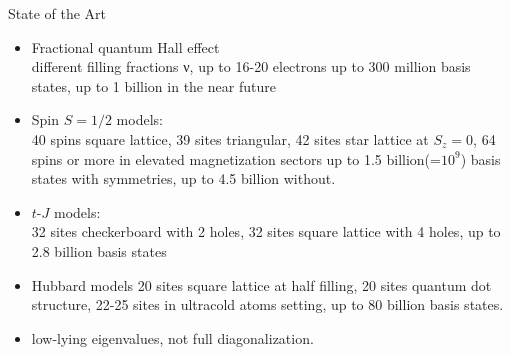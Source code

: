 \documentclass{beamer}
\begin{document}
\begin{frame}{State of the Art}

\begin{itemize}
   \item  Fractional quantum Hall effect\\
    different filling fractions ν, up to 16-20 electrons up to 300 million basis states, up to 1 billion in the near future
    \item Spin $S=1/2$ models:\\
  40 spins square lattice, 39 sites triangular, 42 sites star lattice at $S_z=0$, 64 spins or more in elevated magnetization sectors up to 1.5 billion(=$10^9$) basis states with symmetries, up to 4.5 billion without.
    \item $t$-$J$ models:\\
    32 sites checkerboard with 2 holes, 32 sites square lattice with 4 holes, up to 2.8 billion basis states
   \item Hubbard models
    20 sites square lattice at half filling, 20 sites quantum dot structure, 22-25 sites in ultracold atoms setting, up to 80 billion basis states.
  \item  \alert{low-lying eigenvalues}, not full diagonalization.
\end{itemize}    
\end{frame}
\end{document}
